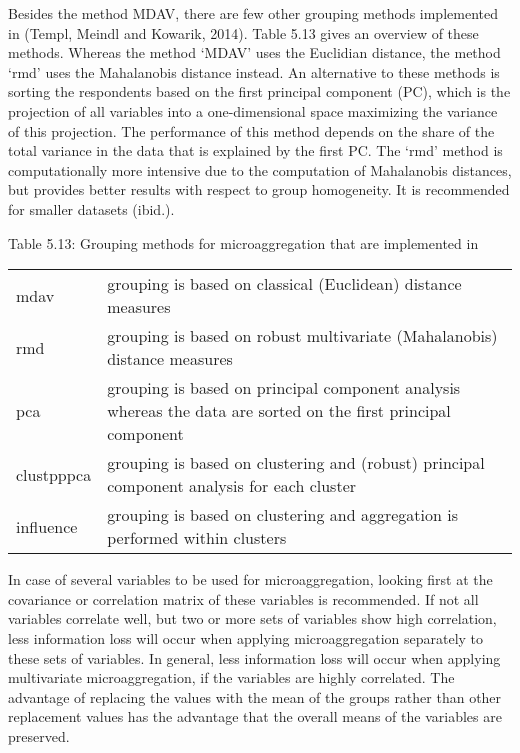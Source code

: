 \documentclass[letterpaper,10pt,english]{sphinxmanual}
\begin{document}
Besides the method MDAV, there are few other grouping methods
implemented in  (Templ, Meindl and Kowarik, 2014). Table 5.13
gives an overview of these methods. Whereas the method ‘MDAV’ uses the
Euclidian distance, the method ‘rmd’ uses the Mahalanobis distance
instead. An alternative to these methods is sorting the respondents
based on the first principal component (PC), which is the projection of
all variables into a one-dimensional space maximizing the variance of
this projection. The performance of this method depends on the share of
the total variance in the data that is explained by the first PC. The
‘rmd’ method is computationally more intensive due to the computation of
Mahalanobis distances, but provides better results with respect to group
homogeneity. It is recommended for smaller datasets (ibid.).

Table 5.13: Grouping methods for microaggregation that are implemented
in 


\begin{savenotes}\sphinxattablestart
\centering
\begin{tabulary}{\linewidth}[t]{|T|T|}
\hline
\sphinxstyletheadfamily 
{}
&\sphinxstyletheadfamily 
{}
\\
\hline
mdav
&
grouping is based on classical
(Euclidean) distance measures
\\
\hline
rmd
&
grouping is based on robust
multivariate (Mahalanobis)
distance measures
\\
\hline
pca
&
grouping is based on principal
component analysis whereas the
data are sorted on the first
principal component
\\
\hline
clustpppca
&
grouping is based on clustering
and (robust) principal component
analysis for each cluster
\\
\hline
influence
&
grouping is based on clustering
and aggregation is performed
within clusters
\\
\hline
\end{tabulary}
\par
\sphinxattableend\end{savenotes}

In case of several variables to be used for microaggregation, looking
first at the covariance or correlation matrix of these variables is
recommended. If not all variables correlate well, but two or more sets
of variables show high correlation, less information loss will occur
when applying microaggregation separately to these sets of variables. In
general, less information loss will occur when applying multivariate
microaggregation, if the variables are highly correlated. The advantage
of replacing the values with the mean of the groups rather than other
replacement values has the advantage that the overall means of the
variables are preserved.
\end{document}
